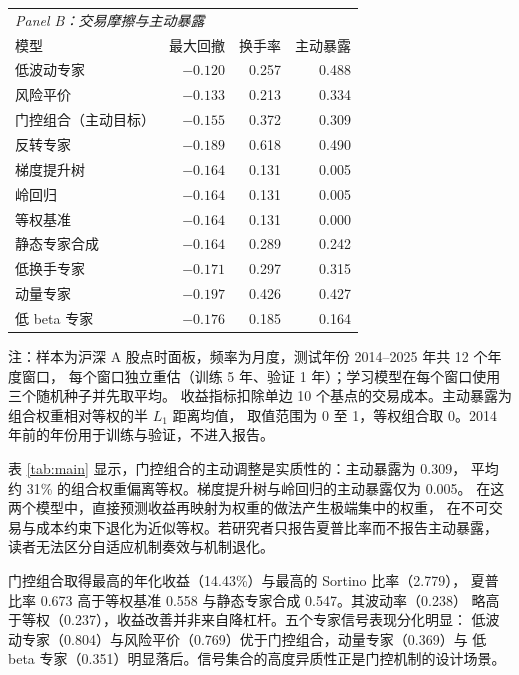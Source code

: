 \begin{table}[htbp]
\begin{threeparttable}
\vspace{0.5em}
\begin{tabular}{lrrr}
\toprule
\multicolumn{4}{l}{\textit{Panel B：交易摩擦与主动暴露}} \\
模型 & 最大回撤 & 换手率 & 主动暴露 \\
\midrule
低波动专家 & $-0.120$ & 0.257 & 0.488 \\
风险平价 & $-0.133$ & 0.213 & 0.334 \\
门控组合（主动目标） & $-0.155$ & 0.372 & 0.309 \\
反转专家 & $-0.189$ & 0.618 & 0.490 \\
梯度提升树 & $-0.164$ & 0.131 & 0.005 \\
岭回归 & $-0.164$ & 0.131 & 0.005 \\
等权基准 & $-0.164$ & 0.131 & 0.000 \\
静态专家合成 & $-0.164$ & 0.289 & 0.242 \\
低换手专家 & $-0.171$ & 0.297 & 0.315 \\
动量专家 & $-0.197$ & 0.426 & 0.427 \\
低 beta 专家 & $-0.176$ & 0.185 & 0.164 \\
\bottomrule
\end{tabular}
\begin{tablenotes}[flushleft]\footnotesize
\item 注：样本为沪深 A 股点时面板，频率为月度，测试年份 2014--2025 年共 12 个年度窗口，
每个窗口独立重估（训练 5 年、验证 1 年）；学习模型在每个窗口使用三个随机种子并先取平均。
收益指标扣除单边 10 个基点的交易成本。主动暴露为组合权重相对等权的半 $L_1$ 距离均值，
取值范围为 0 至 1，等权组合取 0。2014 年前的年份用于训练与验证，不进入报告。
\end{tablenotes}
\end{threeparttable}
\end{table}

表 \ref{tab:main} 显示，门控组合的主动调整是实质性的：主动暴露为 0.309，
平均约 31\% 的组合权重偏离等权。梯度提升树与岭回归的主动暴露仅为 0.005。
在这两个模型中，直接预测收益再映射为权重的做法产生极端集中的权重，
在不可交易与成本约束下退化为近似等权。若研究者只报告夏普比率而不报告主动暴露，
读者无法区分自适应机制奏效与机制退化。

门控组合取得最高的年化收益（14.43\%）与最高的 Sortino 比率（2.779），
夏普比率 0.673 高于等权基准 0.558 与静态专家合成 0.547。其波动率（0.238）
略高于等权（0.237），收益改善并非来自降杠杆。五个专家信号表现分化明显：
低波动专家（0.804）与风险平价（0.769）优于门控组合，动量专家（0.369）与
低 beta 专家（0.351）明显落后。信号集合的高度异质性正是门控机制的设计场景。

